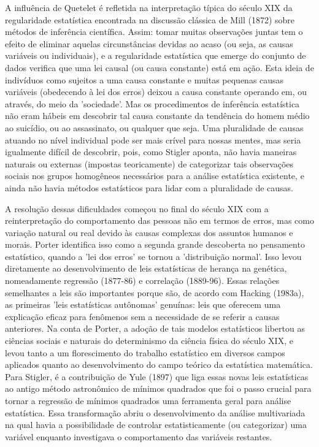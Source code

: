 \documentclass[12pt]{article}
\begin{document}
A influência de Quetelet é refletida na interpretação típica do século XIX da regularidade estatística encontrada na discussão clássica de Mill (1872) sobre métodos de inferência científica. Assim: tomar muitas observações juntas tem o efeito de eliminar aquelas circunstâncias devidas ao acaso (ou seja, as causas variáveis ou individuais), e a regularidade estatística que emerge do conjunto de dados verifica que uma lei causal (ou causa constante) está em ação. Esta ideia de indivíduos como sujeitos a uma causa constante e muitas pequenas causas variáveis (obedecendo à lei dos erros) deixou a causa constante operando em, ou através, do meio da 'sociedade'. Mas os procedimentos de inferência estatística não eram hábeis em descobrir tal causa constante da tendência do homem médio ao suicídio, ou ao assassinato, ou qualquer que seja. Uma pluralidade de causas atuando no nível individual pode ser mais crível para nossas mentes, mas seria igualmente difícil de descobrir, pois, como Stigler aponta, não havia maneiras naturais ou externas (impostas teoricamente) de categorizar tais observações sociais nos grupos homogêneos necessários para a análise estatística existente, e ainda não havia métodos estatísticos para lidar com a pluralidade de causas.

A resolução dessas dificuldades começou no final do século XIX com a reinterpretação do comportamento das pessoas não em termos de erros, mas como variação natural ou real devido às causas complexas dos assuntos humanos e morais. Porter identifica isso como a segunda grande descoberta no pensamento estatístico, quando a 'lei dos erros' se tornou a 'distribuição normal'. Isso levou diretamente ao desenvolvimento de leis estatísticas de herança na genética, nomeadamente regressão (1877-86) e correlação (1889-96). Essas relações semelhantes a leis são importantes porque são, de acordo com Hacking (1983a), as primeiras 'leis estatísticas autônomas' genuínas: leis que oferecem uma explicação eficaz para fenômenos sem a necessidade de se referir a causas anteriores. Na conta de Porter, a adoção de tais modelos estatísticos libertou as ciências sociais e naturais do determinismo da ciência física do século XIX, e levou tanto a um florescimento do trabalho estatístico em diversos campos aplicados quanto ao desenvolvimento do campo teórico da estatística matemática. Para Stigler, é a contribuição de Yule (1897) que liga essas novas leis estatísticas ao antigo método astronômico de mínimos quadrados que foi o passo crucial para tornar a regressão de mínimos quadrados uma ferramenta geral para análise estatística. Essa transformação abriu o desenvolvimento da análise multivariada na qual havia a possibilidade de controlar estatisticamente (ou categorizar) uma variável enquanto investigava o comportamento das variáveis restantes.
\end{document}
